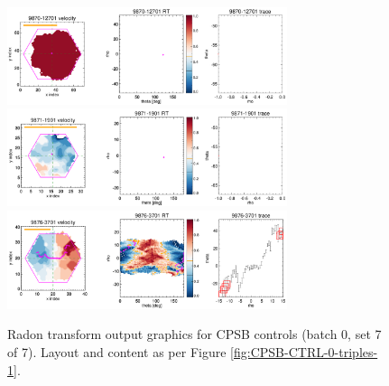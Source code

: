 \documentclass[fleqn,usenatbib]{mnras}
\begin{document}
\begin{figure}
    \centering
    \includegraphics[width=0.73\textwidth]{Images/SN1-MC250/CPSB-CTRL-triples/CPSB-CTRL-9870-12701-1-250.png}
    \includegraphics[width=0.73\textwidth]{Images/SN1-MC250/CPSB-CTRL-triples/CPSB-CTRL-9871-1901-1-250.png}
    \includegraphics[width=0.73\textwidth]{Images/SN1-MC250/CPSB-CTRL-triples/CPSB-CTRL-9876-3701-1-250.png}
    \caption{Radon transform output graphics for CPSB controls (batch 0, set 7 of 7). Layout and content as per Figure \ref{fig:CPSB-CTRL-0-triples-1}.}
    \label{fig:CPSB-CTRL-0-triples-7}
\end{figure}

\end{document}
